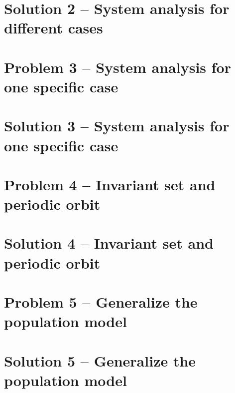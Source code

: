 \documentclass[a4paper,twocolumn]{article} %
\begin{document}
\section*{Solution 2 -- System analysis for different cases}
\label{sec:solu2}



\section*{Problem 3 -- System analysis for one specific case}
\label{sec:prob3} 



\section*{Solution 3 -- System analysis for one specific case}
\label{sec:solu3}



\section*{Problem 4 -- Invariant set and periodic orbit}
\label{sec:pro4}



\section*{Solution 4 -- Invariant set and periodic orbit}
\label{sec:sol4}



\section*{Problem 5 -- Generalize the population model}
\label{sec:prob5}

 
 

\section*{Solution 5 -- Generalize the population model}
\label{sec:solu5}



\clearpage





\end{document}
